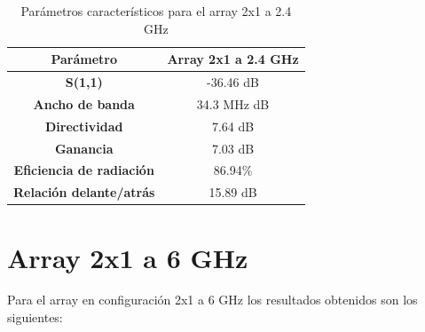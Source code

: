 \begin{table}[H]
  
   
   \small %
   \centering %
   \begin{tabular}{c c} %
   \toprule[\heavyrulewidth]\toprule[\heavyrulewidth]
   \textbf{Parámetro} & \textbf{Array 2x1 a 2.4 GHz} \\ 
   \midrule
   \textbf{S(1,1)} & -36.46 dB \\
   \textbf{Ancho de banda} & 34.3 MHz dB \\
   \textbf{Directividad} & 7.64 dB \\
   \textbf{Ganancia} & 7.03 dB \\
   \textbf{Eficiencia de radiación} & 86.94\% \\
   \textbf{Relación delante/atrás} & 15.89 dB \\

   \bottomrule[\heavyrulewidth] 
   \end{tabular}
  
   \caption{Parámetros característicos para el array 2x1 a 2.4 GHz} 
    \label{tab:res2x11}
\end{table}













\section{Array 2x1 a 6 GHz}
\par Para el array en configuración 2x1 a 6 GHz los resultados obtenidos son los siguientes:


